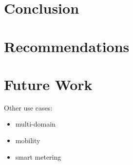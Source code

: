\section{Conclusion} %
\label{sec:conclusion}




\section{Recommendations} %
\label{sec:recommendations}





\section{Future Work} %
\label{sec:future_work}

Other use cases:
\begin{itemize}
	\item multi-domain
	\item mobility
	\item smart metering
\end{itemize}


